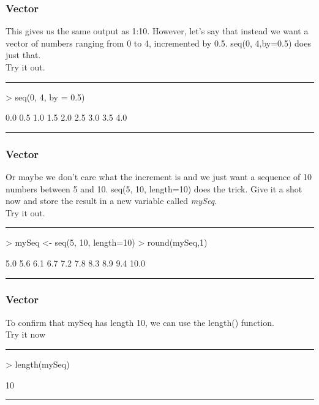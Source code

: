 \documentclass{beamer}
\begin{document}
\begin{frame}[fragile]
	\frametitle{Vector}
	This gives us the same output as 1:10. However, let's say that instead we want a vector of numbers ranging from 0 to 4, incremented by 0.5. seq(0, 4,by=0.5) does just that.\\
	\centering Try it out.\\
	\pause
	\rule{\textwidth}{0.4pt}
\begin{Schunk}
\begin{Sinput}
> seq(0, 4, by = 0.5)
\end{Sinput}
\begin{Soutput}
[1] 0.0 0.5 1.0 1.5 2.0 2.5 3.0 3.5 4.0
\end{Soutput}
\end{Schunk}
\rule{\textwidth}{0.4pt}
\end{frame}

\begin{frame}[fragile]
	\frametitle{Vector}
	Or maybe we don't care what the increment is and we just want a sequence of 10 numbers between 5 and 10. seq(5, 10, length=10) does the trick. Give it a shot now and store the result in a new variable called \textit{mySeq}.\\
	\centering Try it out.\\
	\pause
\rule{\textwidth}{0.4pt}
\begin{Schunk}
\begin{Sinput}
> mySeq <- seq(5, 10, length=10)
> round(mySeq,1)
\end{Sinput}
\begin{Soutput}
 [1]  5.0  5.6  6.1  6.7  7.2  7.8  8.3  8.9  9.4 10.0
\end{Soutput}
\end{Schunk}
  \rule{\textwidth}{0.4pt}
\end{frame}

\begin{frame}[fragile]
\frametitle{Vector}
To confirm that mySeq has length 10, we can use the length() function.\\
\centering Try it now\\
\pause
\rule{\textwidth}{0.4pt}
\begin{Schunk}
\begin{Sinput}
> length(mySeq)
\end{Sinput}
\begin{Soutput}
[1] 10
\end{Soutput}
\end{Schunk}
  \rule{\textwidth}{0.4pt}
\end{frame}
\end{document}
